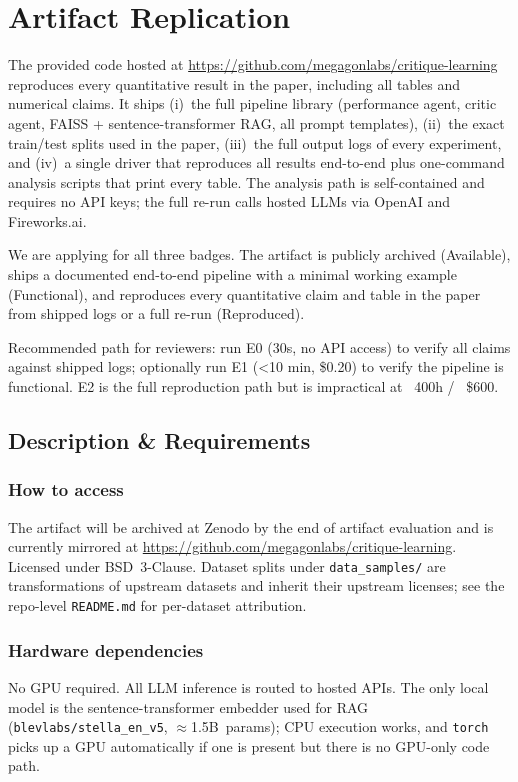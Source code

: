 
\section{Artifact Replication}
The provided code hosted at \url{https://github.com/megagonlabs/critique-learning} reproduces every quantitative result in the paper, including all tables and numerical claims. It ships (i)~the full pipeline library
(performance agent, critic agent, FAISS + sentence-transformer RAG, all
prompt templates), (ii)~the exact train/test splits used in the paper,
(iii)~the full output logs of every experiment, and (iv)~a single driver
that reproduces all results end-to-end plus one-command analysis scripts
that print every table. The analysis path is self-contained and requires
no API keys; the full re-run calls hosted LLMs via OpenAI and Fireworks.ai.

We are applying for all three badges. The artifact is publicly archived (Available), ships a documented end-to-end pipeline with a minimal working example (Functional), and reproduces every quantitative claim and table in the paper from shipped logs or a full re-run (Reproduced).

Recommended path for reviewers: run E0 (30s, no API access) to verify all claims against shipped logs; optionally run E1 (<10 min, \$0.20) to verify the pipeline is functional. E2 is the full reproduction path but is impractical at ~400h / ~\$600.

\subsection{Description \& Requirements}

\subsubsection{How to access}
The artifact will be archived at Zenodo by the end of artifact evaluation and is currently mirrored at
\url{https://github.com/megagonlabs/critique-learning}.
Licensed under BSD~3-Clause. Dataset splits under \texttt{data\_samples/}
are transformations of upstream datasets and inherit their upstream
licenses; see the repo-level \texttt{README.md}
for per-dataset attribution.

\subsubsection{Hardware dependencies}
No GPU required. All LLM inference is routed to hosted APIs. The only
local model is the sentence-transformer embedder used for RAG
(\texttt{blevlabs/stella\_en\_v5}, $\approx$1.5B~params); CPU execution
works, and \texttt{torch} picks up a GPU automatically if one is present
but there is no GPU-only code path.

